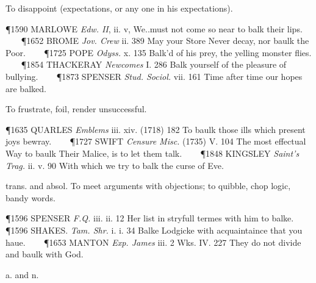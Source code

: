 \begin{description}[wide, labelwidth=!, labelindent=0pt]
\begin{myenumerate}
 To disappoint (expectations, or any one in his expectations).

\P 1590 MARLOWE  \textit{Edw. II}, ii. v, We..must not come so near to balk their lips.    
\P 1652 BROME  \textit{Jov. Crew} ii. 389 May your Store Never decay, nor baulk the Poor.    
\P 1725 POPE  \textit{Odyss.} x. 135 Balk'd of his prey, the yelling monster flies.    
\P 1854 THACKERAY  \textit{Newcomes} I. 286 Balk yourself of the pleasure of bullying.    
\P 1873 SPENSER  \textit{Stud. Sociol.} vii. 161 Time after time our hopes are balked.

 To frustrate, foil, render unsuccessful.

\P 1635 QUARLES  \textit{Emblems} iii. xiv. (1718) 182 To baulk those ills which present joys bewray.    
\P 1727 SWIFT  \textit{Censure Misc.} (1735) V. 104 The most effectual Way to baulk Their Malice, is to let them talk.    
\P 1848 KINGSLEY  \textit{Saint's Trag.} ii. v. 90 With which we try to balk the curse of Eve.

 trans. and absol. To meet arguments with objections; to quibble, chop logic, bandy words.

\P 1596 SPENSER  \textit{F.Q.} iii. ii. 12 Her list in stryfull termes with him to balke.    
\P 1596 SHAKES.  \textit{Tam. Shr.} i. i. 34 Balke Lodgicke with acquaintaince that you haue.    
\P 1653 MANTON  \textit{Exp. James} iii. 2 Wks. IV. 227 They do not divide and baulk with God.
\end{myenumerate}

 a. and n.

\noindent {}

\vspace{-0.3cm}

\begin{myenumerate}


\end{myenumerate}
\end{description}
